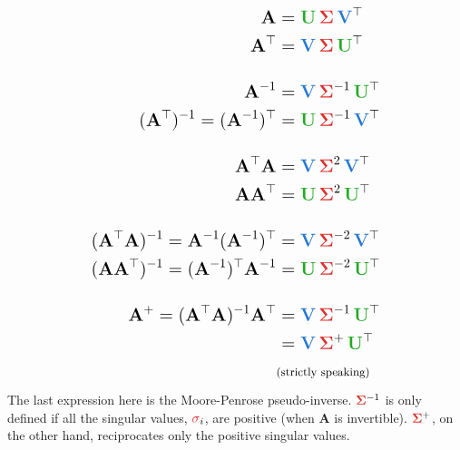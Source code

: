 \documentclass{article}
\newcommand{\mat}[1]{\mathbf{#1}}
\newcommand{\Amat}{\mat{A}}
\newcommand{\Umat}{\textcolor{softgreen}{\mat{U}}}
\newcommand{\Sigmat}{\textcolor{softred}{\mat{\Sigma}}}
\newcommand{\Vmat}{\textcolor{softblue}{\mat{V}}}
\newcommand{\sig}{\textcolor{softred}{\sigma}}
\begin{document}
\[
    \Large
    \begin{aligned}
        \Amat                                                        & = \Umat \,\Sigmat\, \Vmat^\top      \\
        \Amat^\top                                                   & = \Vmat \,\Sigmat\, \Umat^\top      \\[1em]
        \Amat^{-1}                                                   & = \Vmat \,\Sigmat^{-1}\, \Umat^\top \\
        (\Amat^\top)^{-1} = (\Amat^{-1})^\top                        & = \Umat \,\Sigmat^{-1}\, \Vmat^\top \\[1em]
        \Amat^\top \Amat                                             & = \Vmat \,\Sigmat^2\, \Vmat^\top    \\
        \Amat \Amat^\top                                             & = \Umat \,\Sigmat^2\, \Umat^\top    \\[1em]
        (\Amat^\top \Amat)^{-1} = \Amat^{-1}(\Amat^{-1})^\top        & = \Vmat \,\Sigmat^{-2}\, \Vmat^\top \\
        (\Amat \Amat^\top)^{-1} = (\Amat^{-1})^\top \Amat^{-1}       & = \Umat \,\Sigmat^{-2}\, \Umat^\top \\[1em]
        \Amat^+                 = (\Amat^\top \Amat)^{-1} \Amat^\top & = \Vmat \,\Sigmat^{-1}\, \Umat^\top \\
                                                                     & = \Vmat \,\Sigmat^{+}\, \Umat^\top  \\
                                                                     & \text{\small (strictly speaking)}
    \end{aligned}
\]
The last expression here is the Moore-Penrose pseudo-inverse.  $\Sigmat^{-1}$ is only defined if all
the singular values, $\sig_i$, are positive (when $\Amat$ is invertible).  $\Sigmat^+$, on
the other hand, reciprocates only the positive singular values.
\end{document}
